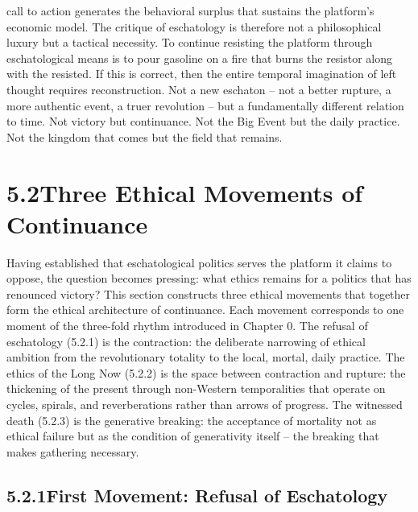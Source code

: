 call to action generates the behavioral surplus that sustains the platform’s economic model. The critique of eschatology is therefore not a philosophical luxury but a tactical necessity. To continue resisting the platform through eschatological means is to pour gasoline on a fire that burns the resistor along with the resisted. If this is correct, then the entire temporal imagination of left thought requires reconstruction. Not a new eschaton – not a better rupture, a more authentic event, a truer revolution – but a fundamentally different relation to time. Not victory but continuance. Not the Big Event but the daily practice. Not the kingdom that comes but the field that remains.

\section{5.2\quad Three Ethical Movements of Continuance}

Having established that eschatological politics serves the platform it claims to oppose, the question becomes pressing: what ethics remains for a politics that has renounced victory? This section constructs three ethical movements that together form the ethical architecture of continuance. Each movement corresponds to one moment of the three-fold rhythm introduced in Chapter 0. The refusal of eschatology (5.2.1) is the contraction: the deliberate narrowing of ethical ambition from the revolutionary totality to the local, mortal, daily practice. The ethics of the Long Now (5.2.2) is the space between contraction and rupture: the thickening of the present through non-Western temporalities that operate on cycles, spirals, and reverberations rather than arrows of progress. The witnessed death (5.2.3) is the generative breaking: the acceptance of mortality not as ethical failure but as the condition of generativity itself – the breaking that makes gathering necessary.

\subsection{5.2.1\quad First Movement: Refusal of Eschatology}

